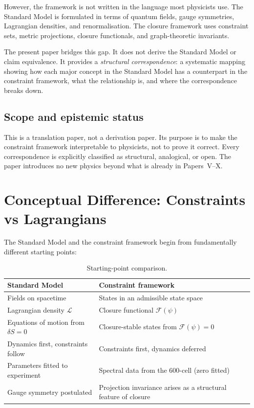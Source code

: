 \documentclass[12pt]{article}
\newcommand{\Fcal}{\mathcal{F}}
\begin{document}
However, the framework is not written in the language most physicists use. The Standard Model is formulated in terms of quantum fields, gauge symmetries, Lagrangian densities, and renormalisation. The closure framework uses constraint sets, metric projections, closure functionals, and graph-theoretic invariants.

The present paper bridges this gap. It does not derive the Standard Model or claim equivalence. It provides a \textit{structural correspondence}: a systematic mapping showing how each major concept in the Standard Model has a counterpart in the constraint framework, what the relationship is, and where the correspondence breaks down.

\subsection*{Scope and epistemic status}

This is a translation paper, not a derivation paper. Its purpose is to make the constraint framework interpretable to physicists, not to prove it correct. Every correspondence is explicitly classified as structural, analogical, or open. The paper introduces no new physics beyond what is already in Papers~V--X.

\section{Conceptual Difference: Constraints vs Lagrangians}\label{sec:difference}

The Standard Model and the constraint framework begin from fundamentally different starting points:

\begin{table}[ht]
\centering
\caption{Starting-point comparison.}
\label{tab:startingpoint}
\begin{tabular}{@{}ll@{}}
\toprule
Standard Model & Constraint framework \\
\midrule
Fields on spacetime & States in an admissible state space \\
Lagrangian density $\mathcal{L}$ & Closure functional $\Fcal(\psi)$ \\
Equations of motion from $\delta S = 0$ & Closure-stable states from $\Fcal(\psi) = 0$ \\
Dynamics first, constraints follow & Constraints first, dynamics deferred \\
Parameters fitted to experiment & Spectral data from the 600-cell (zero fitted) \\
Gauge symmetry postulated & Projection invariance arises as a structural feature of closure \\
\bottomrule
\end{tabular}
\end{table}
\end{document}

